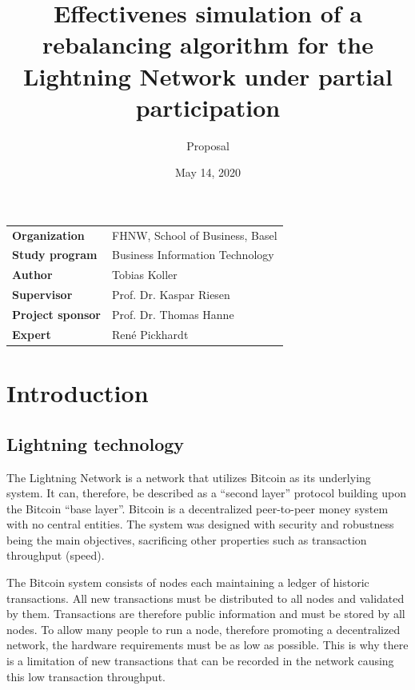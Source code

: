 \documentclass[final]{fhnwreport}       %
\title{Effectivenes simulation of a rebalancing
algorithm for the Lightning Network under partial
participation}                          %
\author{Proposal}                       %
\date{May 14, 2020}                      %
\begin{document}
\maketitle

\vspace*{-1cm}                            %
\vfill
{
\renewcommand\arraystretch{2}
\begin{center}
\begin{tabular}{>{\bf}p{4cm} l}
Organization                  &    FHNW, School of Business, Basel\\
Study program                 &    Business Information Technology\\
Author                         &    Tobias Koller\\
Supervisor                    &    Prof. Dr. Kaspar Riesen\\
Project sponsor               &    Prof. Dr. Thomas Hanne\\
Expert                        &    René Pickhardt
\end{tabular}
\end{center}
}
\clearpage


\section{Introduction}

\subsection{Lightning technology}

The Lightning Network is a network that utilizes Bitcoin as its underlying system. It can, therefore, be described as a ``second layer'' protocol building upon the Bitcoin ``base layer''. Bitcoin is a decentralized peer-to-peer money system with no central entities. The system was designed with security and robustness being the main objectives, sacrificing other properties such as transaction throughput (speed). 

The Bitcoin system consists of nodes each maintaining a ledger of historic transactions. All new transactions must be distributed to all nodes and validated by them. Transactions are therefore public information and must be stored by all nodes. To allow many people to run a node, therefore promoting a decentralized network, the hardware requirements must be as low as possible. This is why there is a limitation of new transactions that can be recorded in the network causing this low transaction throughput.
\end{document}
